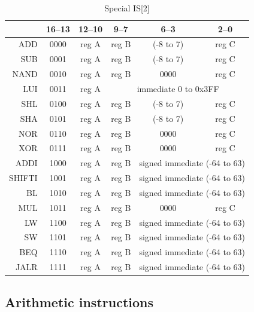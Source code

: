 \documentclass[10pt,a4paper]{article}
\theoremstyle{definition}%
\begin{document}
\begin{table}[ht!]
	\begin{center}
		\begin{tabular}{r|c|c|c|c|c}%
		\toprule
		\diaghead{bourage~}{Instr}{ bit}	& 16--13  & 12--10  & {9--7}  & 6--3  & {2--0}\\
		\midrule
		ADD & 0000 & reg A & reg B & (-8 to 7) & {reg C} \\
		SUB & 0001 & reg A & reg B & (-8 to 7) & {reg C} \\
		NAND & 0010 & reg A & reg B & 0000 & {reg C} \\ \cmidrule{4-6} %
		LUI & 0011 & reg A & \multicolumn{3}{c}{immediate 0 to 0x3FF} \\ %
		\cmidrule{4-6}
		SHL & 0100 & reg A & reg B & (-8 to 7) & {reg C} \\
		SHA & 0101 & reg A & reg B & (-8 to 7) & {reg C} \\
		NOR & 0110 & reg A & reg B & 0000 & {reg C} \\
		XOR & 0111 & reg A & reg B & 0000 & {reg C} \\
		\cmidrule{5-6}
		ADDI & 1000 & reg A & reg B & \multicolumn{2}{c}{signed immediate (-64 to 63)} \\
		SHIFTI & 1001 & reg A & reg B & \multicolumn{2}{c}{signed immediate (-64 to 63)} \\
		BL & 1010 & reg A & reg B & \multicolumn{2}{c}{signed immediate (-64 to 63)} \\
		MUL & 1011 & reg A & reg B & 0000 & {reg C} \\
		LW& 1100 & reg A & reg B & \multicolumn{2}{c}{signed immediate (-64 to 63)} \\
		SW& 1101 & reg A & reg B & \multicolumn{2}{c}{signed immediate (-64 to 63)} \\
		BEQ & 1110 & reg A & reg B & \multicolumn{2}{c}{signed immediate (-64 to 63)} \\
		JALR & 1111 & reg A & reg B & \multicolumn{2}{c}{signed immediate (-64 to 63)} \\
		\bottomrule
		\end{tabular}
	\end{center}
\caption{Special IS[2]}
\label{tab:IS2}
\end{table}

\clearpage
\subsection{Arithmetic instructions}
\end{document}
